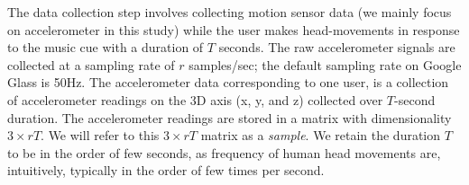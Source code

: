 The data collection step involves collecting motion sensor data (we mainly focus on accelerometer in this study) while the user makes head-movements
in response to the music cue  with a duration of $T$ seconds.
The raw accelerometer
signals are collected at
a sampling rate of $r$ samples/sec; the default sampling rate on
Google Glass is 50Hz. The accelerometer data corresponding to one user,  is a
collection of accelerometer readings on the
3D axis (x, y, and z) collected over $T$-second duration.
The accelerometer readings are stored in a
matrix with dimensionality $3\times rT$. %
We will refer to this $3\times rT$ matrix as a {\em sample}.
We retain the duration $T$ to be in the order of few seconds, as frequency of
human head movements are, intuitively, typically in the order of few times per
second. %





